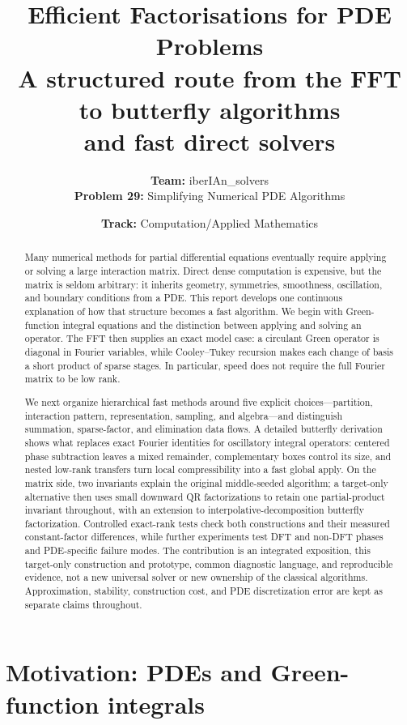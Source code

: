 \documentclass[11pt,a4paper]{article}
\title{\vspace{-8mm}\LARGE\bfseries Efficient Factorisations for PDE Problems\\[4pt]
\large A structured route from the FFT to butterfly algorithms\\and fast direct solvers}
\author{\normalsize \textbf{Team:} iberIAn\_solvers\\[2pt]\textbf{Problem 29:} Simplifying Numerical PDE Algorithms}
\date{\textbf{Track:} Computation/Applied Mathematics}
\begin{document}
\maketitle
\thispagestyle{fancy}
\begin{abstract}
\noindent
Many numerical methods for partial differential equations eventually require applying or solving a large interaction matrix. Direct dense computation is expensive, but the matrix is seldom arbitrary: it inherits geometry, symmetries, smoothness, oscillation, and boundary conditions from a PDE. This report develops one continuous explanation of how that structure becomes a fast algorithm. We begin with Green-function integral equations and the distinction between applying and solving an operator. The FFT then supplies an exact model case: a circulant Green operator is diagonal in Fourier variables, while Cooley--Tukey recursion makes each change of basis a short product of sparse stages. In particular, speed does not require the full Fourier matrix to be low rank.

We next organize hierarchical fast methods around five explicit choices---partition, interaction pattern, representation, sampling, and algebra---and distinguish summation, sparse-factor, and elimination data flows. A detailed butterfly derivation shows what replaces exact Fourier identities for oscillatory integral operators: centered phase subtraction leaves a mixed remainder, complementary boxes control its size, and nested low-rank transfers turn local compressibility into a fast global apply. On the matrix side, two invariants explain the original middle-seeded algorithm; a target-only alternative then uses small downward QR factorizations to retain one partial-product invariant throughout, with an extension to interpolative-decomposition butterfly factorization. Controlled exact-rank tests check both constructions and their measured constant-factor differences, while further experiments test DFT and non-DFT phases and PDE-specific failure modes. The contribution is an integrated exposition, this target-only construction and prototype, common diagnostic language, and reproducible evidence, not a new universal solver or new ownership of the classical algorithms. Approximation, stability, construction cost, and PDE discretization error are kept as separate claims throughout.
\end{abstract}

\tableofcontents
\clearpage

\section{Motivation: PDEs and Green-function integrals}
\label{sec:motivation}
\end{document}
